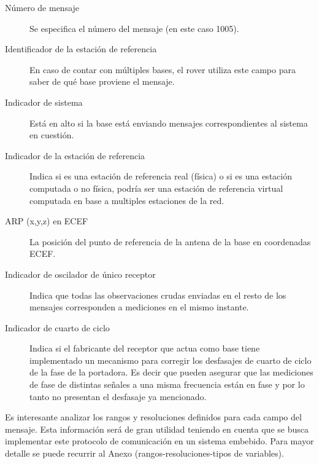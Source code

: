 \documentclass[a4paper,12pt,oneside,onecolumn,final,openright]{book}%
\begin{document}

\begin{description}
	\item[Número de mensaje] Se especifica el número del mensaje (en este caso 1005).
	\item[Identificador de la estación de referencia] En caso de contar con múltiples bases, el rover utiliza este campo para saber de qué base proviene el mensaje.
	\item[Indicador de sistema] Está en alto si la base está enviando mensajes correspondientes al sistema en cuestión.
	\item[Indicador de la estación de referencia] Indica si es una estación de referencia real (física) o si es una estación computada o no física, podría ser una estación de referencia virtual computada en base a multiples estaciones de la red.
	\item[ARP (x,y,z) en ECEF] La posición del punto de referencia de la antena de la base en coordenadas ECEF.
	\item [Indicador de oscilador de único receptor] Indica que todas las observaciones crudas enviadas en el resto de los mensajes corresponden a mediciones en el mismo instante.
	\item[Indicador de cuarto de ciclo] Indica si el fabricante del receptor que actua como base tiene implementado un mecanismo para corregir los desfasajes de cuarto de ciclo de la fase de la portadora. Es decir que pueden asegurar que las mediciones de fase de distintas señales a una misma frecuencia están en fase y por lo tanto no presentan el desfasaje ya mencionado.
\end{description}
	
	Es interesante analizar los rangos y resoluciones definidos para cada campo del mensaje. Esta información será de gran utilidad teniendo en cuenta que se busca implementar este protocolo de comunicación en un sistema embebido. Para mayor detalle se puede recurrir al Anexo (rangos-resoluciones-tipos de variables).
	
\end{document}
